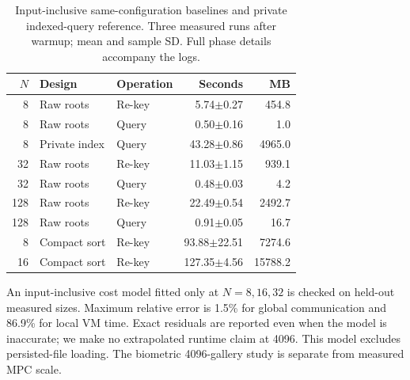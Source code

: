 \begin{table}[t]
\caption{Input-inclusive same-configuration baselines and private indexed-query reference. Three measured runs after warmup; mean and sample SD. Full phase details accompany the logs.}
\label{tab:baselines}\centering\small
\setlength{\tabcolsep}{3pt}
\begin{tabular}{rllrr}
\toprule
$N$ & Design & Operation & Seconds & MB \\
\midrule
8 & Raw roots & Re-key & 5.74$\pm$0.27 & 454.8 \\
8 & Raw roots & Query & 0.50$\pm$0.16 & 1.0 \\
8 & Private index & Query & 43.28$\pm$0.86 & 4965.0 \\
32 & Raw roots & Re-key & 11.03$\pm$1.15 & 939.1 \\
32 & Raw roots & Query & 0.48$\pm$0.03 & 4.2 \\
128 & Raw roots & Re-key & 22.49$\pm$0.54 & 2492.7 \\
128 & Raw roots & Query & 0.91$\pm$0.05 & 16.7 \\
8 & Compact sort & Re-key & 93.88$\pm$22.51 & 7274.6 \\
16 & Compact sort & Re-key & 127.35$\pm$4.56 & 15788.2 \\
\bottomrule
\end{tabular}
\end{table}

An input-inclusive cost model fitted only at $N=8,16,32$ is checked on held-out measured sizes. Maximum relative error is 1.5\% for global communication and 86.9\% for local VM time. Exact residuals are reported even when the model is inaccurate; we make no extrapolated runtime claim at 4096. This model excludes persisted-file loading. The biometric 4096-gallery study is separate from measured MPC scale.
